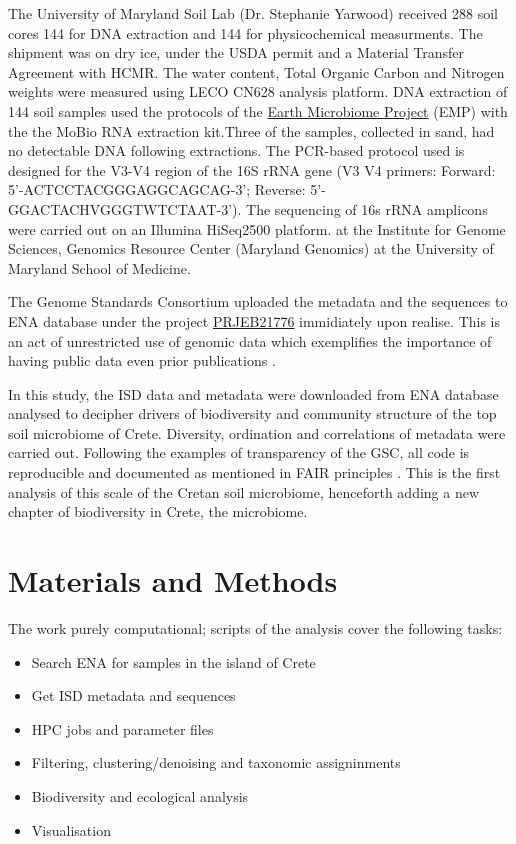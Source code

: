The University of Maryland Soil Lab (Dr. Stephanie Yarwood) received 288 soil cores
144 for DNA extraction and 144 for physicochemical measurments. The shipment was on dry ice,
under the USDA permit and a Material Transfer Agreement with HCMR.
The water content, Total Organic Carbon and Nitrogen weights were measured using LECO CN628 analysis platform.
DNA extraction of 144 soil samples used the protocols of the \href{https://www.protocols.io/view/emp-16s-illumina-amplicon-protocol-cpisvkee}{Earth Microbiome Project} (EMP)
with the the MoBio RNA extraction kit.Three of the samples, collected in sand, had no detectable DNA
following extractions.
The PCR-based protocol used is designed for the V3-V4 region of the 16S rRNA gene (V3 V4 primers: Forward: 5'-ACTCCTACGGGAGGCAGCAG-3'; Reverse: 5'-GGACTACHVGGGTWTCTAAT-3').
The sequencing of 16s rRNA amplicons were carried out on an Illumina HiSeq2500 platform.
at the Institute for Genome Sciences, Genomics Resource Center (Maryland Genomics) at the University of Maryland School of Medicine.

The Genome Standards Consortium uploaded the metadata and the sequences to ENA
database under the project \href{https://www.ebi.ac.uk/ena/browser/view/PRJEB21776}{PRJEB21776} immidiately upon realise. 
This is an act of unrestricted use of genomic data which exemplifies the importance of 
having public data even prior publications \parencite{kopf_2015}.

In this study, the ISD data and metadata were downloaded from ENA database analysed to decipher drivers of 
biodiversity and community structure of the top soil microbiome of Crete. Diversity, 
ordination and correlations of metadata were carried out. Following the examples of 
transparency of the GSC, all code is reproducible and documented as mentioned in FAIR principles \parencite{wilkinson2016the-fair}.
This is the first analysis 
of this scale of the Cretan soil microbiome, henceforth adding a new chapter of 
biodiversity in Crete, the microbiome.

\section{Materials and Methods}\label{isd_methods}

The work purely computational; scripts of the analysis cover the following tasks:
\begin{itemize}
    \item Search ENA for samples in the island of Crete
    \item Get ISD metadata and sequences
    \item HPC jobs and parameter files
    \item Filtering, clustering/denoising and taxonomic assigninments
    \item Biodiversity and ecological analysis 
    \item Visualisation
\end{itemize}

